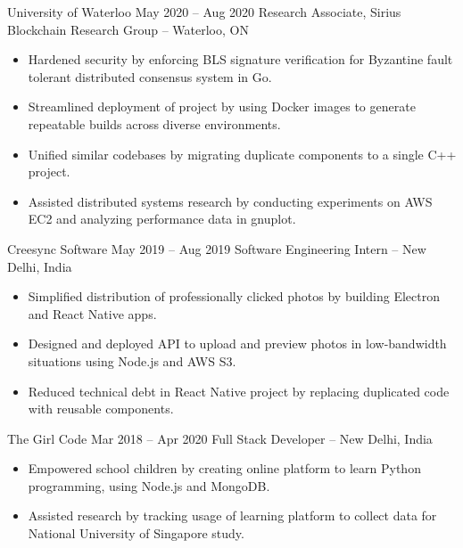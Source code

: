 \documentclass{article}
\begin{document}
\fi
\WorkEntry
{University of Waterloo}
{May 2020 -- Aug 2020}
{Research Associate, Sirius Blockchain Research Group -- Waterloo, ON}
{\begin{itemize} \itemsep -1pt
    \item Hardened security by enforcing BLS signature verification for Byzantine fault tolerant distributed consensus system in Go.
    \item Streamlined deployment of project by using Docker images to generate repeatable builds across diverse environments.
    \item Unified similar codebases by migrating duplicate components to a single  C++ project.
    \item Assisted distributed systems research by conducting experiments on AWS EC2 and analyzing performance data in gnuplot.
    \end{itemize}}
\vspace{1mm}
\iffalse
Designed and build native apps for professional photographers to deliver photos to clients, using Electron and React Native, and created API to preview uploaded photos in low-bandwidth situations, using Node.js and AWS S3. Reduced technical debt in React Native project by combining similar functionality into reusable components.
\fi
\WorkEntry
{Creesync Software}
{May 2019 -- Aug 2019}
{Software Engineering Intern -- New Delhi, India}
{\begin{itemize} \itemsep -1pt
    \item Simplified distribution of professionally clicked photos by building Electron and React Native apps.
    \item Designed and deployed API to upload and preview photos in low-bandwidth situations using Node.js and AWS S3.
    \item Reduced technical debt in React Native project by replacing duplicated code with reusable components.
    \end{itemize}}
\vspace{1mm}
\WorkEntry
{The Girl Code}
{Mar 2018 -- Apr 2020}
{Full Stack Developer -- New Delhi, India}
{\begin{itemize} \itemsep -1pt
	\item Empowered school children by creating online platform to learn Python programming, using Node.js and MongoDB.
	\item Assisted research by tracking usage of learning platform to collect data for National University of Singapore study.
    \end{itemize}}
\end{document}
